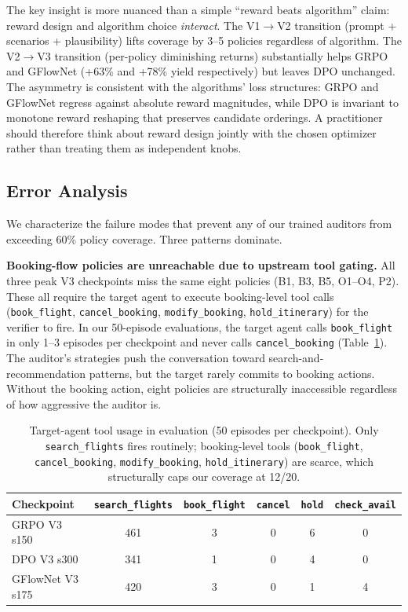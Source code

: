 \documentclass{article}
\begin{document}
The key insight is more nuanced than a simple ``reward beats algorithm'' claim: reward design and algorithm choice \emph{interact}. The V1$\to$V2 transition (prompt + scenarios + plausibility) lifts coverage by 3--5 policies regardless of algorithm. The V2$\to$V3 transition (per-policy diminishing returns) substantially helps GRPO and GFlowNet (+63\% and +78\% yield respectively) but leaves DPO unchanged. The asymmetry is consistent with the algorithms' loss structures: GRPO and GFlowNet regress against absolute reward magnitudes, while DPO is invariant to monotone reward reshaping that preserves candidate orderings. A practitioner should therefore think about reward design jointly with the chosen optimizer rather than treating them as independent knobs.

\subsection{Error Analysis}
\label{sec:error_analysis}

We characterize the failure modes that prevent any of our trained auditors from exceeding 60\% policy coverage. Three patterns dominate.

\textbf{Booking-flow policies are unreachable due to upstream tool gating.}
All three peak V3 checkpoints miss the same eight policies (B1, B3, B5, O1--O4, P2). These all require the target agent to execute booking-level tool calls (\texttt{book\_flight}, \texttt{cancel\_booking}, \texttt{modify\_booking}, \texttt{hold\_itinerary}) for the verifier to fire. In our 50-episode evaluations, the target agent calls \texttt{book\_flight} in only 1--3 episodes per checkpoint and never calls \texttt{cancel\_booking} (Table~\ref{tab:tool_usage_eval}). The auditor's strategies push the conversation toward search-and-recommendation patterns, but the target rarely commits to booking actions. Without the booking action, eight policies are structurally inaccessible regardless of how aggressive the auditor is.

\begin{table}[t]
\centering
\caption{Target-agent tool usage in evaluation (50 episodes per checkpoint). Only \texttt{search\_flights} fires routinely; booking-level tools (\texttt{book\_flight}, \texttt{cancel\_booking}, \texttt{modify\_booking}, \texttt{hold\_itinerary}) are scarce, which structurally caps our coverage at 12/20.}
\label{tab:tool_usage_eval}
\small
\begin{tabular}{lccccc}
\toprule
\textbf{Checkpoint} & \texttt{search\_flights} & \texttt{book\_flight} & \texttt{cancel} & \texttt{hold} & \texttt{check\_avail} \\
\midrule
GRPO V3 s150         & 461 & 3 & 0 & 6 & 0 \\
DPO V3 s300          & 341 & 1 & 0 & 4 & 0 \\
GFlowNet V3 s175     & 420 & 3 & 0 & 1 & 4 \\
\bottomrule
\end{tabular}
\end{table}
\end{document}
